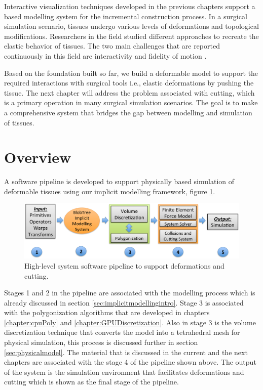 \label{chapter:deformablemodel}
Interactive visualization techniques developed in the previous chapters support a \blob based modelling 
system for the incremental construction process. In a surgical simulation scenario, tissues undergo 
various levels of deformations and topological modifications. Researchers in the field studied different 
approaches to recreate the elastic behavior of tissues. The two main challenges that are reported 
continuously in this field are interactivity and fidelity of motion \cite{Meier2005}. 

Based on the foundation built so far, we build a deformable model to support 
the required interactions with surgical tools i.e., elastic deformations by pushing the tissue. 
The next chapter will address the problem associated with cutting, which is a primary operation in 
many surgical simulation scenarios. The goal is to make a comprehensive system that bridges the gap 
between modelling and simulation of tissues. 

\section{Overview}
A software pipeline is developed to support physically based simulation of deformable tissues using our 
implicit modelling framework, figure \ref{fig:systempipeline}. 

\begin{figure}[H]
  \centering
  \includegraphics[width=1.0\linewidth]{figures/deformable/pipeline.pdf}
  \caption{\label{fig:systempipeline}
  {High-level system software pipeline to support deformations and cutting. }
}
\end{figure}

Stages 1 and 2 in the pipeline are associated with the modelling process which is 
already discussed in section \ref{sec:implicitmodellingintro}. Stage 3 is 
associated with the polygonization algorithms that are developed in chapters \ref{chapter:cpuPoly} 
and \ref{chapter:GPUDiscretization}. Also in stage 3 is the volume discretization technique that converts 
the \blob model into a tetrahedral mesh for physical simulation, this process is discussed further in 
section \ref{sec:physicalmodel}. The material that is discussed in the current and the next chapters are associated with the 
stage 4 of the pipeline shown above. The output of the system is the simulation environment that 
facilitates deformations and cutting which is shown as the final stage of the pipeline. 


